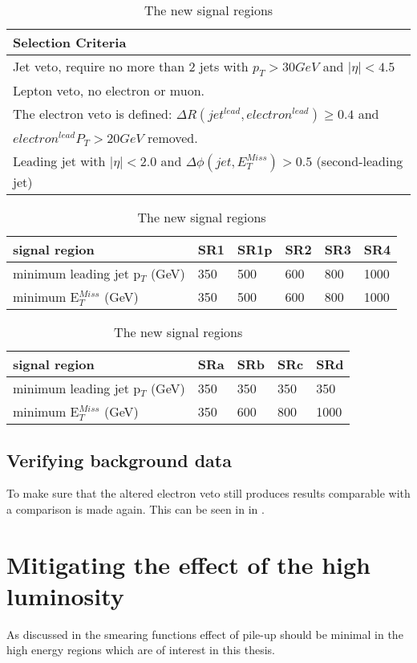 \begin{table}[h]
\begin{center}
\begin{tabular}{l}
\hline
Selection Criteria \\ \hline
Jet veto, require no more than 2 jets with $p_T > 30 GeV$ and $|\eta| < 4.5$ \\
Lepton veto, no electron or muon. \\
The electron veto is defined: $\Delta R (jet^{lead},electron^{lead})\geq 0.4$ and \\
$electron^{lead} P_T>20 GeV$ removed.\\
Leading jet with $|\eta| < 2.0$ and $\Delta \phi (jet, E_T^{Miss})>0.5$ (second-leading jet) \\ 
\end{tabular}
\begin{tabular}{l l l l l l}
\hline
signal region & SR1 & SR1p & SR2 & SR3 & SR4 \\ \hline
minimum leading jet p$_T$ (GeV) & 350 &500& 600 & 800 & 1000 \\
minimum E$^{Miss}_T$ (GeV) & 350&500 & 600 & 800 & 1000 \\
\end{tabular}
\begin{tabular}{l l l l l} \hline
signal region & SRa &  SRb & SRc & SRd \\ \hline
minimum leading jet p$_T$ (GeV) & 350 & 350 & 350 & 350 \\
minimum E$^{Miss}_T$ (GeV) & 350 & 600 & 800 & 1000 \\ \hline
\end{tabular}
\label{tab:newsr}
\caption{The new signal regions}
\end{center}
\end{table}

\subsection{Verifying background data}
To make sure that the altered electron veto still produces results comparable with \citep{ATLAS-CONF-2012-147} a comparison is made again. This can be seen in  in .

\section{Mitigating the effect of the high luminosity}
As discussed in  the smearing functions effect of pile-up should be minimal in the high energy regions which are of interest in this thesis. 


